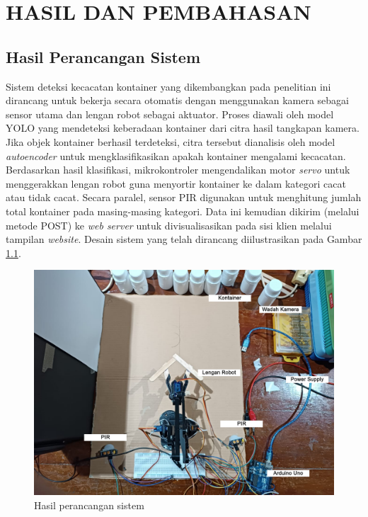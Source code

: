 \chapter{HASIL DAN PEMBAHASAN}
\section{Hasil Perancangan Sistem}
Sistem deteksi kecacatan kontainer yang dikembangkan pada penelitian
ini dirancang untuk bekerja secara otomatis dengan menggunakan kamera
sebagai sensor utama dan lengan robot sebagai aktuator. Proses
diawali oleh model YOLO yang mendeteksi keberadaan kontainer dari
citra hasil tangkapan kamera. Jika objek kontainer berhasil
terdeteksi, citra tersebut dianalisis oleh model \textit{autoencoder}
untuk mengklasifikasikan apakah kontainer mengalami kecacatan.
Berdasarkan hasil klasifikasi, mikrokontroler mengendalikan motor
\textit{servo} untuk menggerakkan lengan robot guna menyortir
kontainer ke dalam kategori cacat atau tidak cacat. Secara paralel,
sensor PIR digunakan untuk menghitung jumlah total kontainer pada
masing-masing kategori. Data ini kemudian dikirim (melalui metode
POST) ke \textit{web server} untuk divisualisasikan pada sisi klien
melalui tampilan \textit{website}. Desain sistem yang telah dirancang
diilustrasikan pada Gambar \ref{fig:rancang-sistem}.

\begin{figure}[H]
  \centering
  \includegraphics[width=\textwidth]{gambar/rancang_sistem.jpg}
  \caption{Hasil perancangan sistem}
  \label{fig:rancang-sistem}
\end{figure}
\vspace{-1em}

